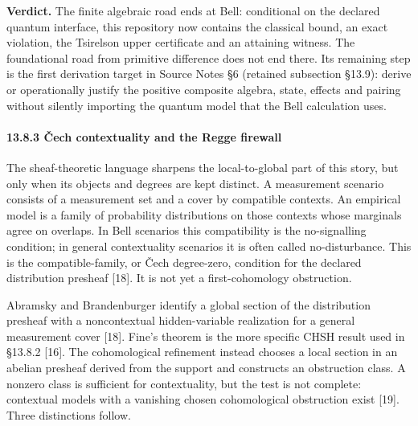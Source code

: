 \documentclass[
  11pt,
]{article}
\begin{document}
\textbf{Verdict.} The finite algebraic road ends at Bell: conditional on
the declared quantum interface, this repository now contains the
classical bound, an exact violation, the Tsirelson upper certificate and
an attaining witness. The foundational road from primitive difference
does not end there. Its remaining step is the first derivation target in
Source Notes §6 (retained subsection §13.9): derive or operationally
justify the positive composite algebra, state, effects and pairing
without silently importing the quantum model that the Bell calculation
uses.

\paragraph{13.8.3 Čech contextuality and the Regge
firewall}\label{ux10dech-contextuality-and-the-regge-firewall}

The sheaf-theoretic language sharpens the local-to-global part of this
story, but only when its objects and degrees are kept distinct. A
measurement scenario consists of a measurement set and a cover by
compatible contexts. An empirical model is a family of probability
distributions on those contexts whose marginals agree on overlaps. In
Bell scenarios this compatibility is the no-signalling condition; in
general contextuality scenarios it is often called no-disturbance. This
is the compatible-family, or Čech degree-zero, condition for the
declared distribution presheaf {[}18{]}. It is not yet a
first-cohomology obstruction.

Abramsky and Brandenburger identify a global section of the distribution
presheaf with a noncontextual hidden-variable realization for a general
measurement cover {[}18{]}. Fine's theorem is the more specific CHSH
result used in §13.8.2 {[}16{]}. The cohomological refinement instead
chooses a local section in an abelian presheaf derived from the support
and constructs an obstruction class. A nonzero class is sufficient for
contextuality, but the test is not complete: contextual models with a
vanishing chosen cohomological obstruction exist {[}19{]}. Three
distinctions follow.
\end{document}
